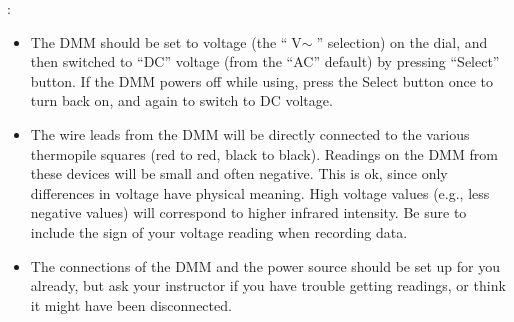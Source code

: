 \newpage

:
	\begin{itemize}
	\item The DMM should be set to voltage (the ``$\text{V}\sim$'' selection) on the dial, and then switched to ``DC'' voltage (from the ``AC'' default) by pressing ``Select'' button.  If the DMM powers off while using, press the Select button once to turn back on, and again to switch to DC voltage.
	\item The wire leads from the DMM will be directly connected to the various thermopile squares (red to red, black to black). Readings on the DMM from these devices will be small and often negative. This is ok, since only differences in voltage have physical meaning. High voltage values (e.g., less negative values) will correspond to higher infrared intensity. Be sure to include the sign of your voltage reading when recording data.  
	\item The connections of the DMM and the power source should be set up for you already, but ask your instructor if you have trouble getting readings, or think it might have been disconnected.
	\end{itemize}

